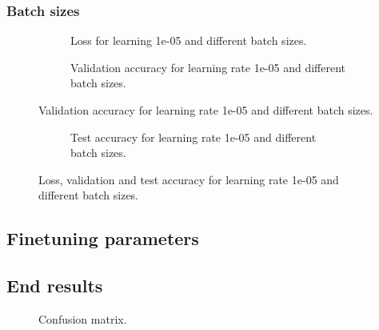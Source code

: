 \subsubsection{Batch sizes}

\begin{figure}
	\begin{subfigure}[b]{\textwidth}
		
		\caption{Loss for learning 1e-05 and different batch sizes.}
	\end{subfigure}

	\begin{subfigure}[b]{\textwidth}
		
		\caption{Validation accuracy for learning rate 1e-05 and different batch sizes.}
	\end{subfigure}
\end{figure}

\begin{figure}
	\ContinuedFloat
	\begin{subfigure}[b]{\textwidth}
		
		\caption{Test accuracy for learning rate 1e-05 and different batch sizes.}
	\end{subfigure}
	\caption{Loss, validation and test accuracy for learning rate 1e-05 and different batch sizes.}
\end{figure}


\subsection{Finetuning parameters}

\subsection{End results}

\begin{figure}
	
	\caption{Confusion matrix.}
\end{figure}
